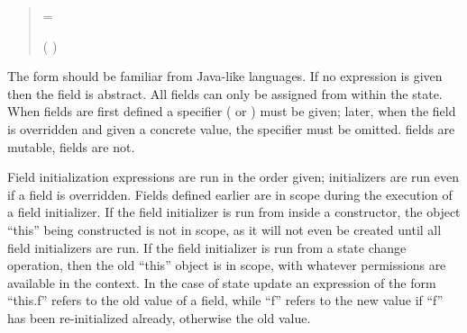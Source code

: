 \begin{quote}




 {}

 {}


 {}   = 


 {}    




 {}   (  )






\end{quote}

The  form should be familiar from Java-like
languages.  If no expression is given then the field is abstract.  All
fields can only be assigned from within the
state. 
When fields are first defined a specifier ( or )
must be given; later, when the field is overridden and given a concrete
value, the specifier must be omitted.
 fields are mutable,  fields
are not.

Field initialization expressions are run in the order given;
initializers are run even if a field is overridden.  Fields defined
earlier are in scope during the execution of a field initializer.
If the field initializer is run from inside a constructor, the
object ``this'' being constructed is not in scope, as it will not
even be created until all field initializers are run.  If the field
initializer is run from a state change operation, then the old ``this''
object is in scope, with whatever permissions are available in the
context.  In the case of state update an expression of the form ``this.f''
refers to the old value of a field, while ``f'' refers to the new value
if ``f'' has been re-initialized already, otherwise the old value.


